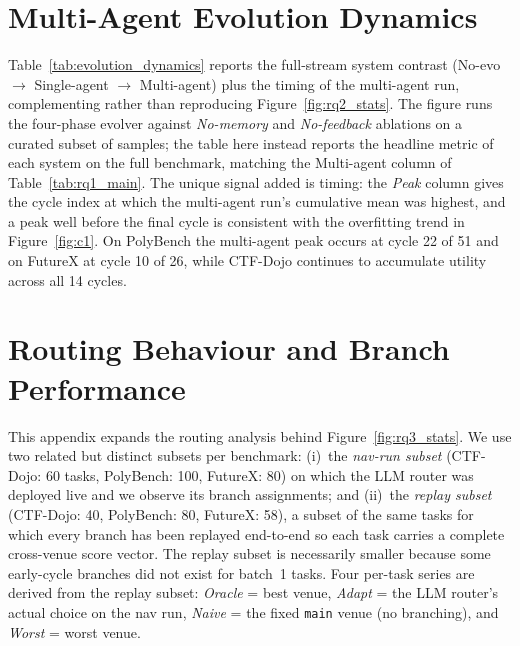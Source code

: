 

\section{Multi-Agent Evolution Dynamics}
\label{app:evolution_dynamics}

Table~\ref{tab:evolution_dynamics} reports the full-stream system contrast (No-evo $\to$ Single-agent $\to$ Multi-agent) plus the timing of the multi-agent run, complementing rather than reproducing Figure~\ref{fig:rq2_stats}. The figure runs the four-phase evolver against \emph{No-memory} and \emph{No-feedback} ablations on a curated subset of samples; the table here instead reports the headline metric of each system on the full benchmark, matching the Multi-agent column of Table~\ref{tab:rq1_main}. The unique signal added is timing: the \emph{Peak} column gives the cycle index at which the multi-agent run's cumulative mean was highest, and a peak well before the final cycle is consistent with the overfitting trend in Figure~\ref{fig:c1}. On PolyBench the multi-agent peak occurs at cycle 22 of 51 and on FutureX at cycle 10 of 26, while CTF-Dojo continues to accumulate utility across all 14 cycles.



\section{Routing Behaviour and Branch Performance}
\label{app:branch_perf}

This appendix expands the routing analysis behind Figure~\ref{fig:rq3_stats}. We use two related but distinct subsets per benchmark: (i)~the \emph{nav-run subset} (CTF-Dojo: 60 tasks, PolyBench: 100, FutureX: 80) on which the LLM router was deployed live and we observe its branch assignments; and (ii)~the \emph{replay subset} (CTF-Dojo: 40, PolyBench: 80, FutureX: 58), a subset of the same tasks for which every branch has been replayed end-to-end so each task carries a complete cross-venue score vector. The replay subset is necessarily smaller because some early-cycle branches did not exist for batch~1 tasks. Four per-task series are derived from the replay subset: \emph{Oracle} = best venue, \emph{Adapt} = the LLM router's actual choice on the nav run, \emph{Naive} = the fixed \texttt{main} venue (no branching), and \emph{Worst} = worst venue.

